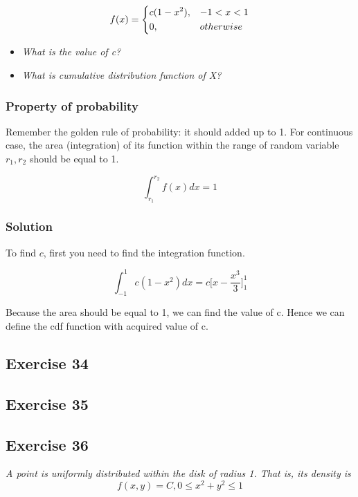 \documentclass[12pt,a4paper]{article}
\begin{document}
\[ f(x) = 
\begin{dcases}
	c(1-x^{2}), & -1 < x < 1 \\
	0, & otherwise
\end{dcases}
\]

\begin{itemize}
	\item \textit{What is the value of c?}
	\item \textit{What is cumulative distribution function of X?}
	
\end{itemize}

\subsubsection{Property of probability}

Remember the golden rule of probability: it should added up to 1. For continuous case, the area (integration) of its function within the range of random variable ${r_1, r_2}$ should be equal to 1.

\[
\int_{r_1}^{r_2} f(x) dx = 1
\]

\subsubsection{Solution}

To find $c$, first you need to find the integration function.

\[
\int_{-1}^{1} c(1-x^{2}) dx = c \Bigg[ x - \frac{x^3}{3} \Bigg]_1^1
\]

Because the area should be equal to 1, we can find the value of c. Hence we can define the cdf function with acquired value of c.


\subsection{Exercise 34}


\subsection{Exercise 35}


\subsection{Exercise 36}

\textit{A point is uniformly distributed within the disk of radius 1. That is, its density is}
\[
f(x,y) = C, 0 \leq x^2 + y^2 \leq 1
\]
\end{document}
